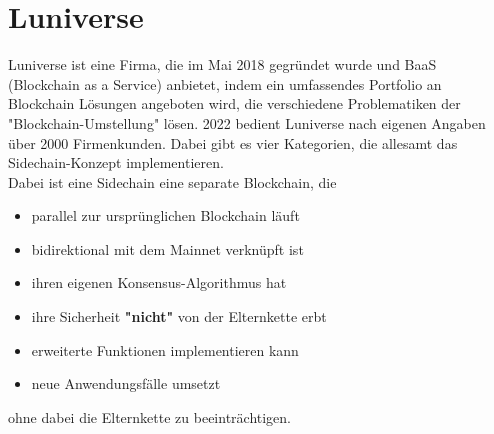 \section{Luniverse}
Luniverse \cite{ID27} ist eine Firma, die im Mai 2018 gegründet wurde und BaaS (Blockchain as a Service) anbietet, indem ein umfassendes Portfolio an Blockchain Lösungen angeboten wird, die verschiedene Problematiken der "Blockchain-Umstellung" lösen. 2022 bedient Luniverse nach eigenen Angaben über 2000 Firmenkunden. Dabei gibt es vier Kategorien, die allesamt das Sidechain-Konzept implementieren. \\
Dabei ist eine Sidechain \cite{ID29} \cite{ID33} eine separate Blockchain, die 
\begin{itemize}
	\item parallel zur ursprünglichen Blockchain läuft
	\item bidirektional mit dem Mainnet verknüpft ist
	\item ihren eigenen Konsensus-Algorithmus hat
	\item ihre Sicherheit \textbf{"nicht"} von der Elternkette erbt
	\item erweiterte Funktionen implementieren kann
	\item neue Anwendungsfälle umsetzt
\end{itemize}
ohne dabei die Elternkette zu beeinträchtigen.

